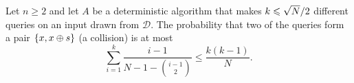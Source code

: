 %
\begin{lemma}\label{lem:collision-1001}
    Let $n \geq 2$ and let $A$ be a deterministic algorithm that makes $k \leqslant \sqrt{N}/2$
    different queries on an input drawn from $\mathcal{D}$. The probability that two of the queries
    form a pair $\left\lbrace x, x \oplus s\right\rbrace$ (a collision) is at most
    \[\sum_{i=1}^{k} \frac{i-1}{N - 1 - \binom{i-1}{2}} \leq \frac{k(k-1)}{N}.\]
\end{lemma}


